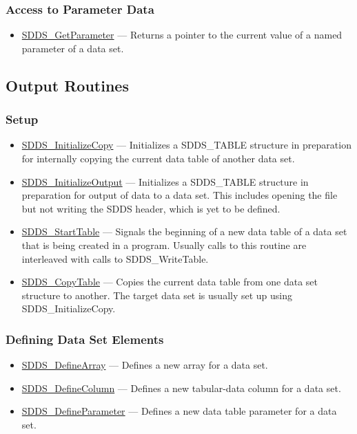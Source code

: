 \documentclass[11pt]{article}
\newcommand{\progref}[1]{\hyperref{SDDS_#1}{{\tt SDDS\_#1} (}{)}{SDDS_#1}}
\begin{document}
\subsubsection{Access to Parameter Data}

\begin{itemize}
\item \progref{GetParameter} --- Returns a pointer to the current value of a named parameter of a data set. 
\end{itemize}

\subsection{Output Routines}
\subsubsection{Setup}

\begin{itemize}
\item \progref{InitializeCopy} --- Initializes a SDDS\_TABLE structure in preparation for internally copying the current data table of another data set.
\item \progref{InitializeOutput} --- Initializes a SDDS\_TABLE structure in preparation for output of data to a data set. This includes opening the file but not writing the SDDS header, which is yet to be defined.
\item \progref{StartTable} --- Signals the beginning of a new data table of a data set that is being created in a program. Usually calls to this routine are interleaved with calls to SDDS\_WriteTable.
\item \progref{CopyTable} --- Copies the current data table from one data set structure to another. The target data set is usually set up using SDDS\_InitializeCopy. 
\end{itemize}

\subsubsection{Defining Data Set Elements}

\begin{itemize}
\item \progref{DefineArray} --- Defines a new array for a data set.
\item \progref{DefineColumn} --- Defines a new tabular-data column for a data set.
\item \progref{DefineParameter} --- Defines a new data table parameter for a data set. 
\end{itemize}
\end{document}
